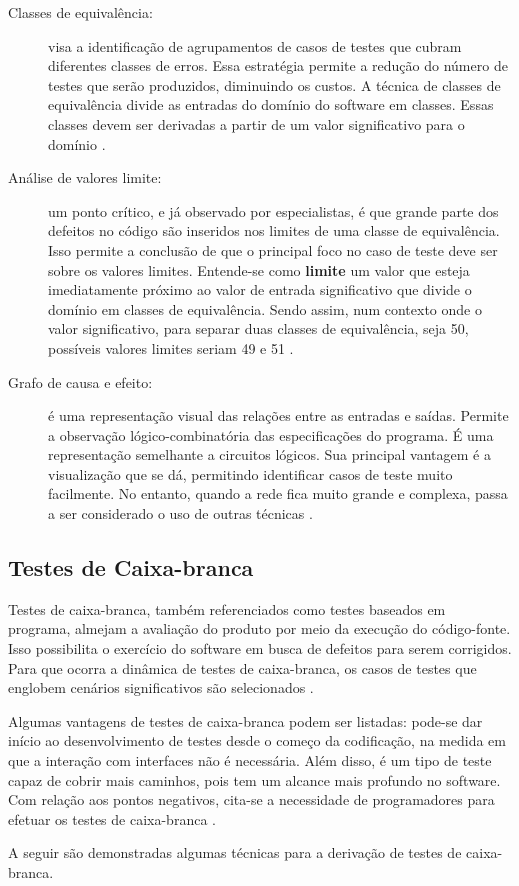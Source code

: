 \begin{description}
\item[Classes de equivalência:] visa a identificação de agrupamentos de casos de testes que cubram diferentes classes de erros. Essa estratégia permite a redução do número de testes que serão produzidos, diminuindo os custos. A técnica de classes de equivalência divide as entradas do domínio do software em classes. Essas classes devem ser derivadas a partir de um valor significativo para o domínio \cite{williams2006}.
\item[Análise de valores limite:] um ponto crítico, e já observado por especialistas, é que grande parte dos defeitos no código são inseridos nos limites de uma classe de equivalência. Isso permite a conclusão de que o principal foco no caso de teste deve ser sobre os valores limites. Entende-se como \textbf{limite} um valor que esteja imediatamente próximo ao valor de entrada significativo que divide o domínio em classes de equivalência. Sendo assim, num contexto onde o valor significativo, para separar duas classes de equivalência, seja 50, possíveis valores limites seriam 49 e 51 \cite{williams2006}.
\item[Grafo de causa e efeito:] é uma representação visual das relações entre as entradas e saídas. Permite a observação lógico-combinatória das especificações do programa. É uma representação semelhante a circuitos lógicos. Sua principal vantagem é a visualização que se dá, permitindo identificar casos de teste muito facilmente. No entanto, quando a rede fica muito grande e complexa, passa a ser considerado o uso de outras técnicas \cite{barbosaEtAl2009}.
\end{description}


\subsection{Testes de Caixa-branca}
Testes de caixa-branca, também referenciados como testes baseados em programa, almejam a avaliação do produto por meio da execução do código-fonte. Isso possibilita o exercício do software em busca de defeitos para serem corrigidos. Para que ocorra a dinâmica de testes de caixa-branca, os casos de testes que englobem cenários significativos são selecionados \cite{barbosaEtAl2009}.
\par
\indent Algumas vantagens de testes de caixa-branca podem ser listadas: pode-se dar início ao desenvolvimento de testes desde o começo da codificação, na medida em que a interação com interfaces não é necessária. Além disso, é um tipo de teste capaz de cobrir mais caminhos, pois tem um alcance mais profundo no software. Com relação aos pontos negativos, cita-se a necessidade de programadores para efetuar os testes de caixa-branca \cite{barbosaEtAl2009}.
\par
\indent A seguir são demonstradas algumas técnicas para a derivação de testes de caixa-branca.


